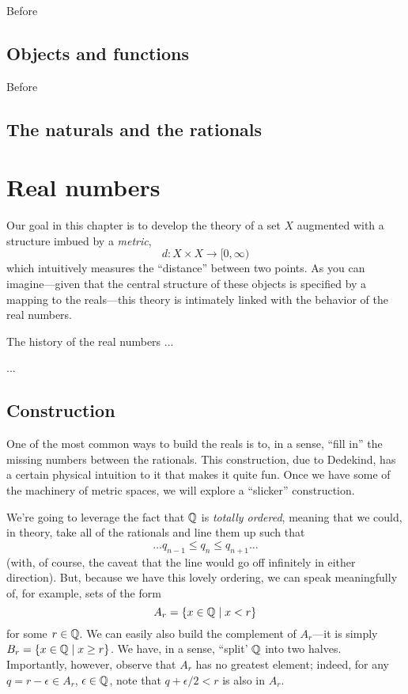 Before

\subsection{Objects and functions} 

Before

\subsection{The naturals and the rationals}



\section{Real numbers}

Our goal in this chapter is to develop the theory of a set $X$ augmented with a structure imbued by a \emph{metric}, 
\[ d: X \times X \to [0, \infty) \]
which intuitively measures the ``distance'' between two points. As you can imagine---given that the central structure of these objects is specified by a mapping to the reals---this theory is intimately linked with the behavior of the real numbers.

The history of the real numbers ...

...

\subsection{Construction}

One of the most common ways to build the reals is to, in a sense, ``fill in'' the missing numbers between the rationals. This construction, due to Dedekind, has a certain physical intuition to it that makes it quite fun. Once we have some of the machinery of metric spaces, we will explore a ``slicker'' construction.

We're going to leverage the fact that $\mathbb{Q}$ is \emph{totally ordered}, meaning that we could, in theory, take all of the rationals and line them up such that
\[ \ldots q_{n-1} \leq q_{n} \leq q_{n+1} \ldots \]
(with, of course, the caveat that the line would go off infinitely in either direction). But, because we have this lovely ordering, we can speak meaningfully of, for example, sets of the form
\[ A_r = \left\{ x \in \mathbb{Q} \mid x < r \right\} \]
for some $r \in \mathbb{Q}$. We can easily also build the complement of $A_r$---it is simply $B_r = \left\{ x \in \mathbb{Q} \mid x \geq r \right\}$. We have, in a sense, ``split' $\mathbb{Q}$ into two halves. Importantly, however, observe that $A_r$ has no greatest element; indeed, for any $q = r - \epsilon \in A_r$, $\epsilon \in \mathbb{Q}$, note that $q + \epsilon/2 < r$ is also in $A_r$.

